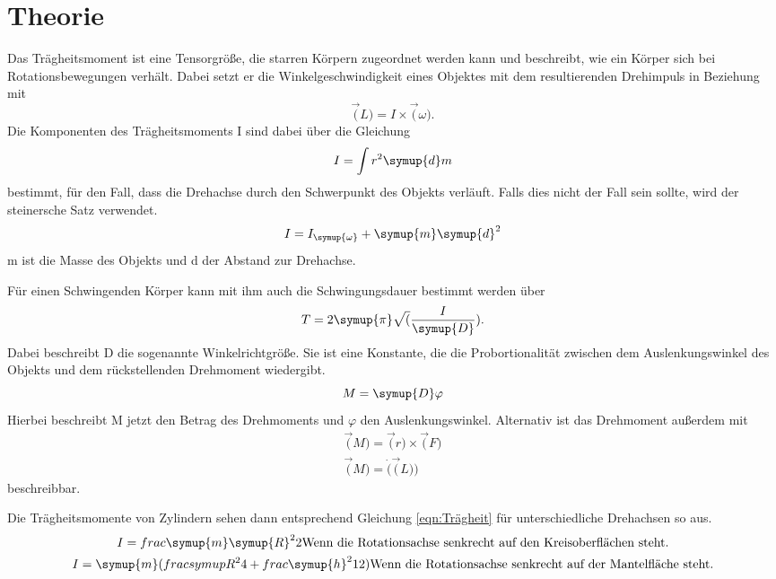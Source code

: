 \section{Theorie}
\label{sec:Theorie}
Das Trägheitsmoment ist eine Tensorgröße, die starren Körpern zugeordnet werden kann und beschreibt, wie ein Körper sich bei
Rotationsbewegungen verhält.
Dabei setzt er die Winkelgeschwindigkeit eines Objektes mit dem resultierenden Drehimpuls in Beziehung mit
\begin{equation}
    \vec(L)=I\times\vec(\omega)\text{.}
    \label{eqn:Dreh1}
\end{equation}
Die Komponenten des Trägheitsmoments I sind dabei über die Gleichung
\begin{equation}
    I=\int r^2 \symup{d}m
    \label{eqn:Trägheit}
\end{equation}
bestimmt, für den Fall, dass die Drehachse durch den Schwerpunkt des Objekts verläuft. 
Falls dies nicht der Fall sein sollte, wird der steinersche Satz verwendet.
\begin{equation}
    I=I_{\symup{\omega}}+\symup{m} \symup{d}^2
    \label{eqn:Steiner}
\end{equation}   
m ist die Masse des Objekts und d der Abstand zur Drehachse. 

Für einen Schwingenden Körper kann mit ihm auch die Schwingungsdauer bestimmt werden über
\begin{equation}
    T=2 \symup{\pi} \sqrt(\frac{I}{\symup{D}})\text{.}
    \label{eqn:Schwingungsdauer}
\end{equation}
Dabei beschreibt D die sogenannte Winkelrichtgröße. Sie ist eine Konstante, die die Probortionalität zwischen dem 
Auslenkungswinkel des Objekts und dem rückstellenden Drehmoment wiedergibt.
\begin{equation}
    M=\symup{D} \varphi %
    \label{eqn:Drehmom1}
\end{equation} 
Hierbei beschreibt M jetzt den Betrag des Drehmoments und $\varphi$ den Auslenkungswinkel.
Alternativ ist das Drehmoment außerdem mit
\begin{equation}
    \begin{gather}
        \vec(M)=\vec(r) \times \vec(F) \\ \vec(M)=\dot(\vec(L))
    \end{gather}
    \label{eqn:Drehmom2}
\end{equation}
beschreibbar.

Die Trägheitsmomente von Zylindern sehen dann entsprechend Gleichung \ref{eqn:Trägheit} für unterschiedliche
Drehachsen so aus.
\begin{equation}
    \begin{gather}
        I=frac{\symup{m}\symup{R}^2}{2} \text{Wenn die Rotationsachse senkrecht auf den Kreisoberflächen steht.}\\
        I=\symup{m} (frac{symup{R}^2}{4}+frac{\symup{h}^2}{12}) \text{Wenn die Rotationsachse senkrecht auf der Mantelfläche steht.}
    \end{gather}
\end{equation}
\cite{sample}
